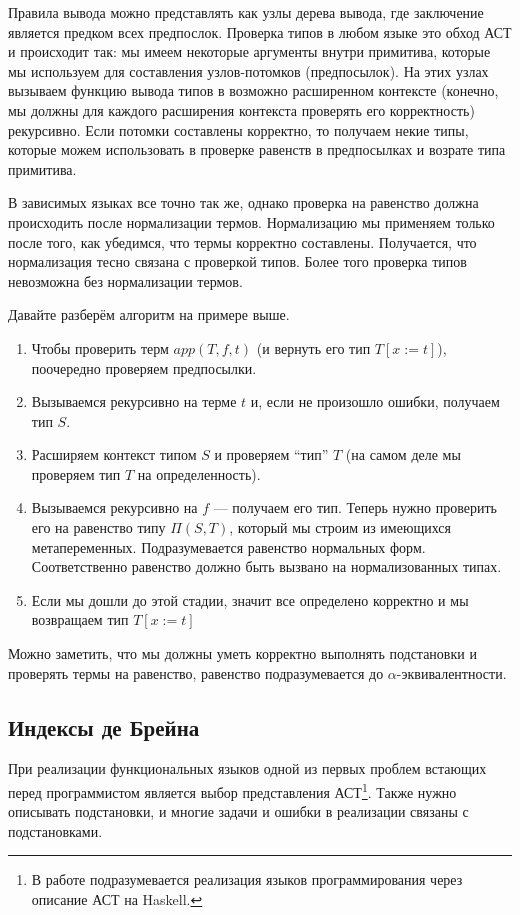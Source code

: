 Правила вывода можно представлять как узлы дерева вывода, где заключение является предком всех предпослок. Проверка типов в любом языке это обход АСТ и происходит так: мы имеем некоторые аргументы внутри примитива, которые мы используем для составления узлов-потомков (предпосылок). На этих узлах вызываем функцию вывода типов в возможно расширенном контексте (конечно, мы должны для каждого расширения контекста проверять его корректность) рекурсивно. Если потомки составлены корректно, то получаем некие типы, которые можем использовать в проверке равенств в предпосылках и возрате типа примитива.

В зависимых языках все точно так же, однако проверка на равенство должна происходить после нормализации термов. Нормализацию мы применяем только после того, как убедимся, что термы корректно составлены. Получается, что нормализация тесно связана с проверкой типов. Более того проверка типов невозможна без нормализации термов.

Давайте разберём алгоритм на примере выше.
\begin{enumerate}
\item Чтобы проверить терм $app(T, f, t)$ (и вернуть его тип $T[x:=t]$), поочередно проверяем предпосылки. \item Вызываемся рекурсивно на терме $t$ и, если не произошло ошибки, получаем тип $S$.
\item Расширяем контекст типом $S$ и проверяем ``тип'' $T$ (на самом деле мы проверяем тип $T$ на определенность).
\item Вызываемся рекурсивно на $f$ --- получаем его тип. Теперь нужно проверить его на равенство типу $\Pi(S, T)$, который мы строим из имеющихся метапеременных. Подразумевается равенство нормальных форм. Соответственно равенство должно быть вызвано на нормализованных типах.
\item Если мы дошли до этой стадии, значит все определено корректно и мы возвращаем тип $T[x:=t]$
\end{enumerate}

Можно заметить, что мы должны уметь корректно выполнять подстановки и проверять термы на равенство, равенство подразумевается до $\alpha$-эквивалентности.

\subsection{Индексы де Брейна}\label{de_brujin}
При реализации функциональных языков одной из первых проблем встающих перед программистом является выбор представления АСТ\footnote{В работе подразумевается реализация языков программирования через описание АСТ на Haskell.}. Также нужно описывать подстановки, и многие задачи и ошибки в реализации связаны с подстановками.

